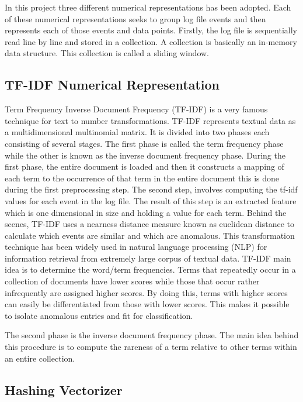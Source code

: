 \documentclass[12pt, letterpaper, titlepage]{report}
\begin{document}
In this project three different numerical representations has been adopted. Each of these numerical representations seeks to group log file events and then represents each of those events and data points. Firstly, the log file is sequentially read line by line and stored in a collection. A collection is basically an in-memory data structure. This collection is called a sliding window.

\subsection{TF-IDF Numerical Representation}
Term Frequency Inverse Document Frequency (TF-IDF) is a very famous technique for text to number transformations. TF-IDF represents textual data as a multidimensional  multinomial matrix. It is divided into two phases each consisting of several stages. The first phase is called the term frequency phase while the other is known as the inverse document frequency phase. During the first phase, the entire document is loaded and then it constructs a mapping of each term to the occurrence of that term in the entire document this is done during the first preprocessing step. The second step, involves computing the tf-idf values for each event in the log file. The result of this step is an extracted feature which is one dimensional in size and holding a value for each term. Behind the scenes, TF-IDF uses a nearness distance measure known as euclidean distance to calculate which events are similar and which are anomalous. This transformation technique has been widely used in natural language processing (NLP) for information retrieval from extremely large corpus of textual data. TF-IDF main idea is to determine the word/term frequencies. Terms that repeatedly occur in a collection of documents have lower scores while those that occur rather infrequently are assigned higher scores. By doing this, terms with higher scores can easily be differentiated from those with lower scores. This makes it possible to isolate anomalous entries and fit for classification.

The second phase is the inverse document frequency phase. The main idea behind this procedure is to compute the rareness of a term relative to other terms within an entire collection.


\subsection{Hashing Vectorizer}
\end{document}
